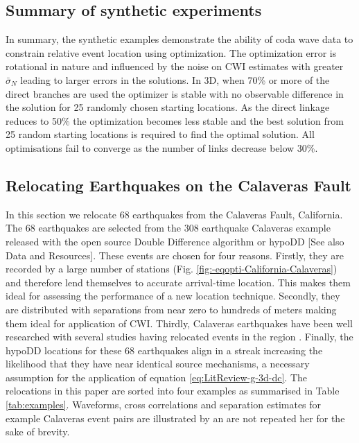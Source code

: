 \documentclass[12pt,double]{article}
\begin{document}
\subsection*{Summary of synthetic experiments}

In summary, the synthetic examples demonstrate the ability of coda
wave data to constrain relative event location using optimization.
The optimization error is rotational in nature and 
influenced by the noise on CWI estimates
with greater $\bar{\sigma}_N$ leading to larger errors in the
solutions. In 3D, when 70\% or more of the direct branches are used the
optimizer is stable with no observable difference in the solution
for 25 randomly chosen starting locations. As the direct linkage
reduces to 50\% the optimization becomes less stable and the best
solution from 25 random starting locations is required to find the
optimal solution. All optimisations fail to converge as the number
of links decrease below 30\%.

\vspace{2em}
\begin{centering}
\section*{Relocating Earthquakes on the Calaveras Fault}
\end{centering}
\label{sec:CalaverasLoc-CWIonly}

In this section we relocate 68 earthquakes from the Calaveras Fault,
California. The 68 earthquakes are selected from the 308 earthquake
Calaveras example released with the open source Double Difference
algorithm or hypoDD \citep{dr_Waldhauser00a, dr_Waldhauser01a} [See
also Data and Resources]. These events are chosen for four
reasons. Firstly, they are recorded by a large number of stations
(Fig. \ref{fig:-eqopti-California-Calaveras}) and therefore lend
themselves to accurate arrival-time location. This makes them ideal
for assessing the performance of a new location technique. Secondly,
they are distributed with separations from near zero to hundreds of
meters making them ideal for application of CWI. Thirdly, Calaveras
earthquakes have been well researched with several studies having
relocated events in the region \citep{dr_Waldhauser01a,
dr_Schaff02a, dr_Waldhauser08a}. Finally, the hypoDD locations for
these 68 earthquakes align in a streak increasing the likelihood
that they have near identical source mechanisms, a necessary
assumption for the application of equation
\ref{eq:LitReview-g-3d-dc}. The relocations in this paper are sorted
into four examples as summarised in Table \ref{tab:examples}. Waveforms, 
cross correlations and separation estimates for example Calaveras event pairs are 
illustrated by \citet{dr_Robinson11a} an are not repeated her for the sake of brevity.
\end{document}

